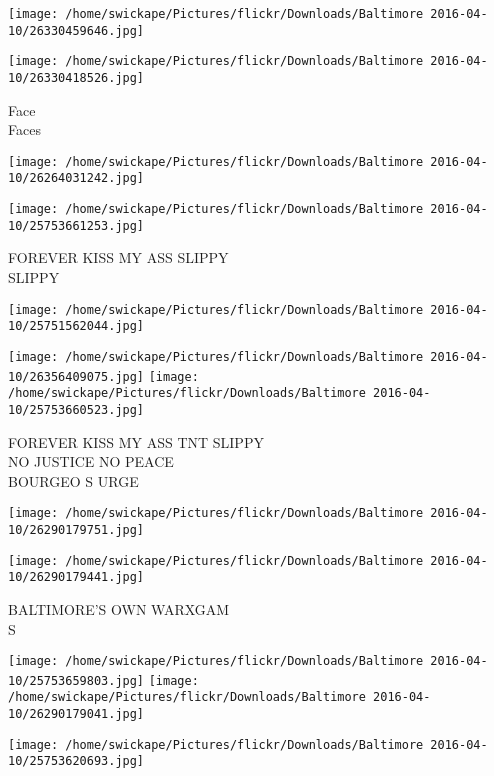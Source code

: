 \documentclass[10pt,letterpaper]{article}
\begin{document}
\texttt{[image: /home/swickape/Pictures/flickr/Downloads/Baltimore 2016-04-10/26330459646.jpg]}

\vspace{0.25in}
\texttt{[image: /home/swickape/Pictures/flickr/Downloads/Baltimore 2016-04-10/26330418526.jpg]}

Face\\
Faces
\pagebreak

\texttt{[image: /home/swickape/Pictures/flickr/Downloads/Baltimore 2016-04-10/26264031242.jpg]}

\vspace{0.25in}
\texttt{[image: /home/swickape/Pictures/flickr/Downloads/Baltimore 2016-04-10/25753661253.jpg]}

FOREVER KISS MY ASS SLIPPY\\
SLIPPY
\pagebreak

\texttt{[image: /home/swickape/Pictures/flickr/Downloads/Baltimore 2016-04-10/25751562044.jpg]}

\vspace{0.25in}
\texttt{[image: /home/swickape/Pictures/flickr/Downloads/Baltimore 2016-04-10/26356409075.jpg]}
\texttt{[image: /home/swickape/Pictures/flickr/Downloads/Baltimore 2016-04-10/25753660523.jpg]}

FOREVER KISS MY ASS TNT SLIPPY\\
NO JUSTICE NO PEACE\\
BOURGEO S URGE
\pagebreak

\texttt{[image: /home/swickape/Pictures/flickr/Downloads/Baltimore 2016-04-10/26290179751.jpg]}

\vspace{0.25in}
\texttt{[image: /home/swickape/Pictures/flickr/Downloads/Baltimore 2016-04-10/26290179441.jpg]}

BALTIMORE'S OWN WARXGAM\\
S
\pagebreak

\texttt{[image: /home/swickape/Pictures/flickr/Downloads/Baltimore 2016-04-10/25753659803.jpg]}
\texttt{[image: /home/swickape/Pictures/flickr/Downloads/Baltimore 2016-04-10/26290179041.jpg]}

\vspace{0.25in}
\texttt{[image: /home/swickape/Pictures/flickr/Downloads/Baltimore 2016-04-10/25753620693.jpg]}
\end{document}
